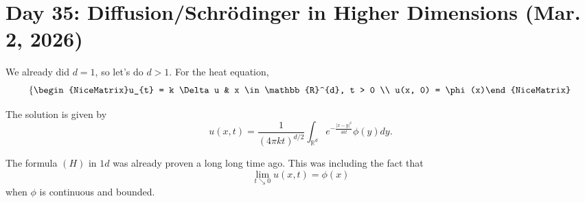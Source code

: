 \section{Day 35: Diffusion/Schr\"odinger in Higher Dimensions (Mar. 2, 2026)}
We already did \( d = 1 \), so let's do \( d > 1 \). For the heat equation,
\[ \left\{\begin{NiceMatrix}u_{t} = k \Delta u & x \in \mathbb{R}^{d}, t > 0 \\ u(x, 0) = \phi(x)\end{NiceMatrix}\right.  \]
\begin{theorem}
	The solution is given by
	\[ \tag{H} u(x, t) = \frac{1}{\left( 4 \pi k t \right)^{d/2}} \int_{\mathbb{R}^{d}} e^{- \frac{|x - y|^{2}}{4 k t}} \phi(y) dy. \]
\end{theorem}

\begin{remark}
	The formula \( (H) \) in \( 1d \) was already proven a long long time ago. This was including the fact that 
	\[ \lim_{t \searrow 0} u(x, t) = \phi(x) \]
	when \( \phi \) is continuous and bounded.
\end{remark}

